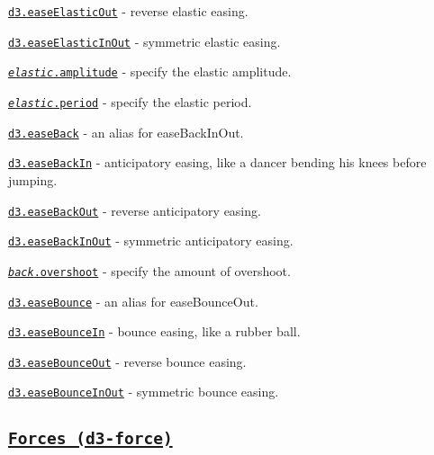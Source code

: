 \begin{DoxyItemize}
\item \href{https://github.com/d3/d3-ease/blob/master/README.md#easeElasticOut}{\tt d3.\+ease\+Elastic\+Out} -\/ reverse elastic easing.
\item \href{https://github.com/d3/d3-ease/blob/master/README.md#easeElasticInOut}{\tt d3.\+ease\+Elastic\+In\+Out} -\/ symmetric elastic easing.
\item \href{https://github.com/d3/d3-ease/blob/master/README.md#elastic_amplitude}{\tt {\itshape elastic}.amplitude} -\/ specify the elastic amplitude.
\item \href{https://github.com/d3/d3-ease/blob/master/README.md#elastic_period}{\tt {\itshape elastic}.period} -\/ specify the elastic period.
\item \href{https://github.com/d3/d3-ease/blob/master/README.md#easeBack}{\tt d3.\+ease\+Back} -\/ an alias for ease\+Back\+In\+Out.
\item \href{https://github.com/d3/d3-ease/blob/master/README.md#easeBackIn}{\tt d3.\+ease\+Back\+In} -\/ anticipatory easing, like a dancer bending his knees before jumping.
\item \href{https://github.com/d3/d3-ease/blob/master/README.md#easeBackOut}{\tt d3.\+ease\+Back\+Out} -\/ reverse anticipatory easing.
\item \href{https://github.com/d3/d3-ease/blob/master/README.md#easeBackInOut}{\tt d3.\+ease\+Back\+In\+Out} -\/ symmetric anticipatory easing.
\item \href{https://github.com/d3/d3-ease/blob/master/README.md#back_overshoot}{\tt {\itshape back}.overshoot} -\/ specify the amount of overshoot.
\item \href{https://github.com/d3/d3-ease/blob/master/README.md#easeBounce}{\tt d3.\+ease\+Bounce} -\/ an alias for ease\+Bounce\+Out.
\item \href{https://github.com/d3/d3-ease/blob/master/README.md#easeBounceIn}{\tt d3.\+ease\+Bounce\+In} -\/ bounce easing, like a rubber ball.
\item \href{https://github.com/d3/d3-ease/blob/master/README.md#easeBounceOut}{\tt d3.\+ease\+Bounce\+Out} -\/ reverse bounce easing.
\item \href{https://github.com/d3/d3-ease/blob/master/README.md#easeBounceInOut}{\tt d3.\+ease\+Bounce\+In\+Out} -\/ symmetric bounce easing.
\end{DoxyItemize}

\subsection*{\href{https://github.com/d3/d3-force}{\tt Forces (d3-\/force)}}

